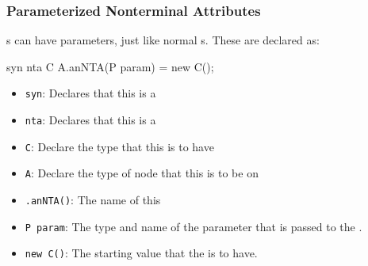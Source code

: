 \subsubsection{Parameterized Nonterminal Attributes}\label{subsubsec:Parameterized_Nonterminal_Attributes}
s can have parameters, just like normal s.
These are declared as:
\begin{javasource}
  syn nta C A.anNTA(P param) = new C();
\end{javasource}
\begin{itemize}[noitemsep]
\item \texttt{syn}: Declares that this  is a 
\item \texttt{nta}: Declares that this  is a 
\item \texttt{C}: Declare the type that this  is to have
\item \texttt{A}: Declare the type of  node that this  is to be on
\item \texttt{.anNTA()}: The name of this 
\item \texttt{P param}: The type and name of the parameter that is passed to the .
\item \texttt{new C()}: The starting value that the  is to have.
\end{itemize}

